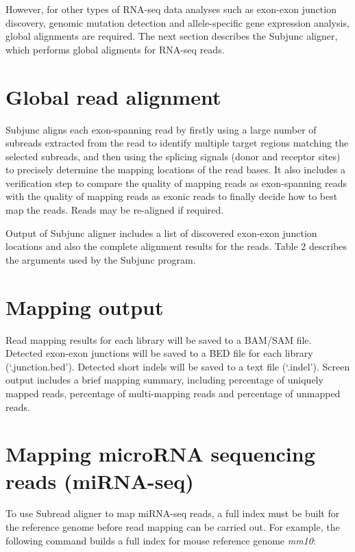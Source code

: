 \documentclass[12pt]{report}
\newcommand{\Subread}{\textsf{Subread}}
\newcommand{\Subjunc}{\textsf{Subjunc}}
\begin{document}
However, for other types of RNA-seq data analyses such as exon-exon junction discovery, genomic mutation detection and allele-specific gene expression analysis, global alignments are required.
The next section describes the {\Subjunc} aligner, which performs global aligments for RNA-seq reads.
 
\section{Global read alignment}

{\Subjunc} aligns each exon-spanning read by firstly using a large number of subreads extracted from the read to identify multiple target regions matching the selected subreads, and then using the splicing signals (donor and receptor sites) to precisely determine the mapping locations of the read bases.
It also includes a verification step to compare the quality of mapping reads as exon-spanning reads with the quality of mapping reads as exonic reads to finally decide how to best map the reads.
Reads may be re-aligned if required.

Output of {\Subjunc} aligner includes a list of discovered exon-exon junction locations and also the complete alignment results for the reads.
Table 2 describes the arguments used by the {\Subjunc} program.\\


\section{Mapping output}

Read mapping results for each library will be saved to a BAM/SAM file.
Detected exon-exon junctions will be saved to a BED file for each library (`.junction.bed').
Detected short indels will be saved to a text file (`.indel').
Screen output includes a brief mapping summary, including percentage of uniquely mapped reads, percentage of multi-mapping reads and percentage of unmapped reads.

\section{Mapping microRNA sequencing reads (miRNA-seq)}

To use {\Subread} aligner to map miRNA-seq reads, a full index must be built for the reference genome before read mapping can be carried out.
For example, the following command builds a full index for mouse reference genome \emph{mm10}:
\end{document}
